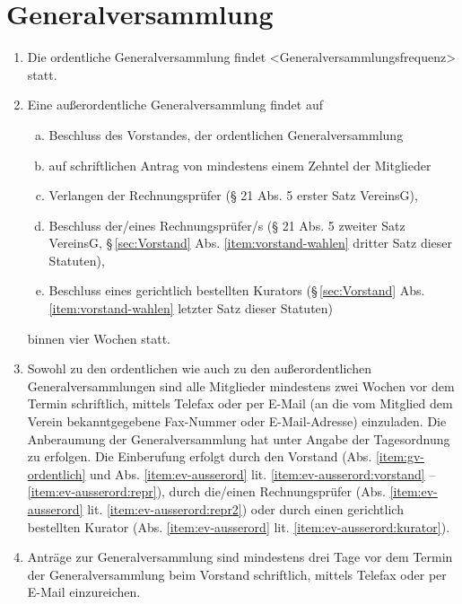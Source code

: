 \documentclass[a4paper,12pt]{article}
\begin{document}
\section{Generalversammlung} %
\label{sec:Generalversammlung}
\begin{enumerate}
\item\label{item:gv-ordentlich} Die ordentliche Generalversammlung findet
 <Generalversammlungsfrequenz> statt. %
\item\label{item:ev-ausserord} Eine außerordentliche Generalversammlung findet auf 
\begin{enumerate}[(a)]
\item\label{item:ev-ausserord:vorstand} Beschluss des Vorstandes, der ordentlichen Generalversammlung 
\item\label{item:ev-ausserord:mitglieder} auf schriftlichen Antrag von mindestens einem Zehntel der Mitglieder 
\item\label{item:ev-ausserord:repr} Verlangen der Rechnungsprüfer (§ 21 Abs. 5 erster Satz VereinsG),
\item\label{item:ev-ausserord:repr2} Beschluss der/eines Rechnungsprüfer/s (§ 21 Abs. 5 zweiter Satz VereinsG, §\,\ref{sec:Vorstand} Abs. \ref{item:vorstand-wahlen} dritter Satz dieser Statuten),
\item\label{item:ev-ausserord:kurator} Beschluss eines gerichtlich bestellten Kurators (§\,\ref{sec:Vorstand} Abs. \ref{item:vorstand-wahlen} letzter Satz dieser Statuten)
\end{enumerate}
binnen vier Wochen statt.

\item Sowohl zu den ordentlichen wie auch zu den außerordentlichen Generalversammlungen sind alle Mitglieder mindestens zwei Wochen vor dem Termin schriftlich, mittels Telefax oder per E-Mail (an die vom Mitglied dem Verein bekanntgegebene Fax-Nummer oder E-Mail-Adresse) einzuladen. Die Anberaumung der Generalversammlung hat unter Angabe der Tagesordnung zu erfolgen. Die Einberufung erfolgt durch den Vorstand (Abs. \ref{item:gv-ordentlich} und Abs. \ref{item:ev-ausserord} lit. \ref{item:ev-ausserord:vorstand} – \ref{item:ev-ausserord:repr}), durch die/einen Rechnungsprüfer (Abs. \ref{item:ev-ausserord} lit. \ref{item:ev-ausserord:repr2}) oder durch einen gerichtlich bestellten Kurator (Abs. \ref{item:ev-ausserord} lit. \ref{item:ev-ausserord:kurator}).

\item Anträge zur Generalversammlung sind mindestens drei Tage vor dem Termin der Generalversammlung beim Vorstand schriftlich, mittels Telefax oder per E-Mail einzureichen.


\end{enumerate}
\end{document}
